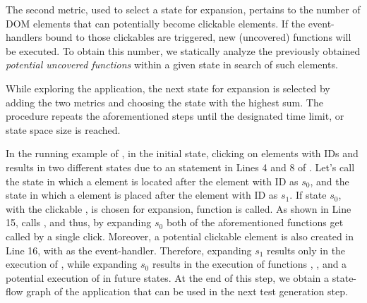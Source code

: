 The second metric, used to select a state for expansion, pertains to the number of DOM elements that can potentially become clickable elements. If the event-handlers bound to those clickables are triggered, new (uncovered) functions will be executed. To obtain this number, we statically analyze the previously obtained \emph{potential uncovered functions} within a given state in search of such elements.

While exploring the application, the next state for expansion is selected by adding the two metrics 
and choosing the state with the highest sum.
%
The procedure repeats the aforementioned steps until the designated time limit, or state space size is reached. %

In the running example of , in the initial state, clicking on elements with IDs  and  results in two different states due to an  statement in Lines 4 and 8 of . Let's call the state in which a  element is located after the element with ID  as $s_0$, and the state in which a  element is placed after the element with ID   as $s_1$. If state $s_0$, with the clickable , is chosen for expansion, function  is called. As shown in Line 15,  calls , and thus, by expanding $s_0$ both of the aforementioned functions get called by a single click. Moreover, a potential clickable element is also created in Line 16, with  as the event-handler. Therefore,  expanding $s_1$  results only in the execution of , while expanding $s_0$ results in the execution of functions , , and a potential execution of  in future states. 
At the end of this step, we obtain a state-flow graph of the application that can be used in the next test generation step.